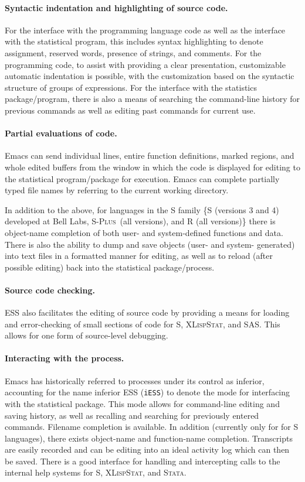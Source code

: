 \documentclass{article}
\newcommand*{\Splus}{\textsc{S-Plus}}
\newcommand*{\XLispStat}{\textsc{XLispStat}}
\newcommand*{\Stata}{\textsc{Stata}}
\newcommand{\stexttt}[1]{{\small\texttt{#1}}}
\begin{document}
\paragraph{Syntactic indentation and highlighting of source code.}
For the interface with the programming language code as well as the
interface with the statistical program, this includes syntax
highlighting to denote assignment, reserved words, presence of
strings, and comments.
For the programming code, to assist with providing a clear
presentation, customizable automatic indentation is possible, with the
customization based on the syntactic structure of groups of
expressions.  For the interface with the statistics package/program,
there is also a means of searching the command-line history for
previous commands as well as editing past commands for current use.

\paragraph{Partial evaluations of code.}
Emacs can send individual lines, entire function definitions, marked
regions, and whole edited buffers from the window in which the code is
displayed for editing to the statistical program/package for
execution.  Emacs can complete partially typed file
names by referring to the current working directory.

In addition to the above, for languages in the S family \{S
(versions 3 and 4) developed at Bell Labs, \Splus\ (all versions), and
R (all versions)\} there is object-name completion of both user- and
system-defined functions and data.  There is also the ability to dump
and save objects (user- and system- generated) into text files in a
formatted manner for editing, as well as to reload (after possible
editing) back into the statistical package/process.

\paragraph{Source code checking.}
ESS also facilitates the editing of source code by providing a means
for loading and error-checking of small sections of code for S,
\XLispStat, and SAS.  This allows for one form of source-level
debugging.

\paragraph{Interacting with the process.}
Emacs has historically referred to processes under its control as
inferior, accounting for the name inferior ESS (\stexttt{iESS}) to
denote the mode for interfacing with the statistical package.  This
mode allows for command-line editing and saving history, as well as
recalling and searching for previously entered commands.
Filename completion is available.    In addition (currently only for for S
languages), there exists object-name and function-name completion.
Transcripts are easily recorded and can be editing into an ideal
activity log which can then be saved.  There is a good interface for
handling and intercepting calls to the internal help systems for S,
\XLispStat, and \Stata.
\end{document}
